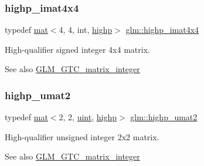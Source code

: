 \subsubsection{\texorpdfstring{highp\+\_\+imat4x4}{highp\_imat4x4}}
{\footnotesize\ttfamily typedef \mbox{\hyperlink{structglm_1_1mat}{mat}}$<$4, 4, int, \mbox{\hyperlink{namespaceglm_a36ed105b07c7746804d7fdc7cc90ff25ac6f7eab42eacbb10d59a58e95e362074}{highp}}$>$ \mbox{\hyperlink{group__gtc__matrix__integer_gaae7cdd2394ff80ecf1be6d78bfde629a}{glm\+::highp\+\_\+imat4x4}}}

High-\/qualifier signed integer 4x4 matrix. \begin{DoxySeeAlso}{See also}
\mbox{\hyperlink{group__gtc__matrix__integer}{G\+L\+M\+\_\+\+G\+T\+C\+\_\+matrix\+\_\+integer}} 
\end{DoxySeeAlso}
\mbox{\label{group__gtc__matrix__integer_ga0788642172aac0bb6c4c16750c92ed96}} 
\subsubsection{\texorpdfstring{highp\+\_\+umat2}{highp\_umat2}}
{\footnotesize\ttfamily typedef \mbox{\hyperlink{structglm_1_1mat}{mat}}$<$2, 2, \mbox{\hyperlink{group__core__precision_ga4fd29415871152bfb5abd588334147c8}{uint}}, \mbox{\hyperlink{namespaceglm_a36ed105b07c7746804d7fdc7cc90ff25ac6f7eab42eacbb10d59a58e95e362074}{highp}}$>$ \mbox{\hyperlink{group__gtc__matrix__integer_ga0788642172aac0bb6c4c16750c92ed96}{glm\+::highp\+\_\+umat2}}}

High-\/qualifier unsigned integer 2x2 matrix. \begin{DoxySeeAlso}{See also}
\mbox{\hyperlink{group__gtc__matrix__integer}{G\+L\+M\+\_\+\+G\+T\+C\+\_\+matrix\+\_\+integer}} 
\end{DoxySeeAlso}
\mbox{\label{group__gtc__matrix__integer_ga21045c3ef9df4966779713fa1a7b4b52}} 
